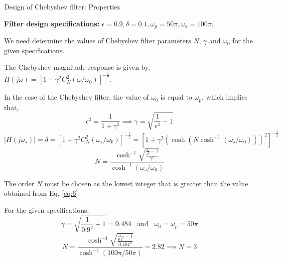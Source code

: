 \documentclass{beamer}
\begin{document}
\begin{frame}{Design of Chebyshev filter: Properties}
\begin{tiny}
\textbf{Filter design specifications:} $\epsilon=0.9, \delta = 0.1, \omega_p = 50\pi, \omega_s = 100\pi$. 

We need determine the values of Chebyshev filter parameters $N$, $\gamma$ and $\omega_0$ for the given specifications.

The Chebyshev magnitude response is given by, $H(j\omega) = \left[1 + \gamma^2C_N^2(\omega/\omega_0)\right]^{-\frac{1}{2}} $.

In the case of the Chebyshev filter, the value of $\omega_0$ is equal to $\omega_p$, which implies that,
\vspace{-1mm}
\begin{equation}
\epsilon^2 = \frac{1}{1 + \gamma^2} \implies \gamma = \sqrt{\frac{1}{\epsilon^2}-1}
\label{eq:4}
\end{equation}
\vspace{-2mm}
\begin{equation}
\left|H(j\omega_s)\right| = \delta = \left[1 + \gamma^2C_N^2(\omega_s/\omega_0)\right]^{-\frac{1}{2}} = \left[1 + \gamma^2\left(\cosh \left(N\cosh^{-1} (\omega_s/\omega_0)\right)\right)^2\right]^{-\frac{1}{2}}
\label{eq:5}
\end{equation}
\vspace{-2mm}
\begin{equation}
N = \frac{\cosh^{-1}\sqrt{\frac{\frac{1}{\delta^2} -1}{\gamma^2}}}{\cosh^{-1} (\omega_s/\omega_0)}
\label{eq:6}
\end{equation}

The order $N$ must be chosen as the lowest integer that is greater than the value obtained from Eq. \ref{eq:6}.

For the given specifications, 
\[ \gamma = \sqrt{\frac{1}{0.9^2} - 1} = 0.484 \,\,\, \text{ and } \,\,\, \omega_0 = \omega_p = 50\pi \]
\[ N = \frac{\cosh^{-1}\sqrt{\frac{\frac{1}{0.1^2} -1}{0.484^2}}}{\cosh^{-1} (100\pi/50\pi)} = 2.82 \implies N = 3 \]
\end{tiny}
\end{frame}
\end{document}
